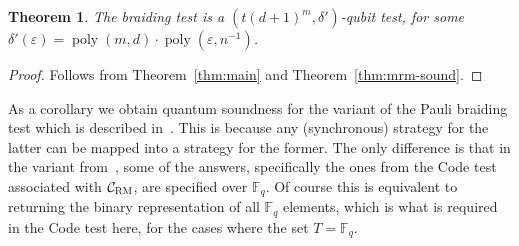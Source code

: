 \documentclass[11pt]{article}
\newtheorem{theorem}{Theorem}[section]
\theoremstyle{definition}
\newcommand{\code}{\mathcal{C}}
\newcommand{\F}{\ensuremath{\mathbb{F}}}
\newcommand{\RM}{\ensuremath{\textsc{RM}}}
\DeclareMathOperator{\poly}{poly}
\newcommand{\eps}{\varepsilon}
\begin{document}
\begin{theorem}
The braiding test is a $(t(d+1)^m,\delta')$-qubit test, for some $\delta'(\eps)=\poly(m,d)\cdot \poly(\eps,n^{-1})$.
\end{theorem}

\begin{proof}
Follows from Theorem~\ref{thm:main} and Theorem~\ref{thm:mrm-sound}.
\end{proof}

As a corollary we obtain quantum soundness for the variant of the Pauli braiding test which is described in~\cite[Section 7.3]{ji2020mip}. This is because any (synchronous) strategy for the latter can be mapped into a strategy for the former. The only difference is that in the variant from~\cite{ji2020mip}, some of the answers, specifically the ones from the Code test associated with $\code_\RM$, are specified over $\F_q$. Of course this is equivalent to returning the binary representation of all $\F_q$ elements, which is what is required in the Code test here, for the cases where the set $T=\F_q$. 




\notesendofpaper
\end{document}
